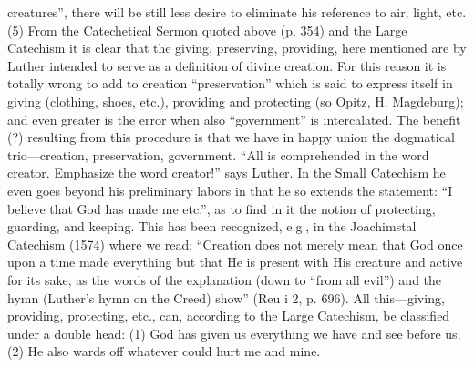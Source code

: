 creatures”, there will be still less desire to eliminate his reference to air, light, etc. (5) From the Catechetical Sermon quoted above (p. 354) and the Large Catechism it is clear that the giving, preserving, providing, here mentioned are by Luther intended to serve as a definition of divine creation. For this reason it is totally wrong to add to creation “preservation” which is said to express itself in giving (clothing, shoes, etc.), providing and protecting (so Opitz, H. Magdeburg); and even greater is the error when also “government” is intercalated. The benefit (?) resulting from this procedure is that we have in happy union the dogmatical trio—creation, preservation, government. “All is comprehended in the word creator. Emphasize the word creator!” says Luther. In the Small Catechism he even goes beyond his preliminary labors in that he so extends the statement: “I believe that God has made me etc.”, as to find in it the notion of protecting, guarding, and keeping. This has been recognized, e.g., in the Joachimstal Catechism (1574) where we read: “Creation does not merely mean that God once upon a time made everything but that He is present with His creature and active for its sake, as the words of the explanation (down to “from all evil”) and the hymn (Luther’s hymn on the Creed) show” (Reu i 2, p. 696). All this—giving, providing, protecting, etc., can, according to the Large Catechism, be classified under a double head: (1) God has given us everything we have and see before us; (2) He also wards off whatever could hurt me and mine.

